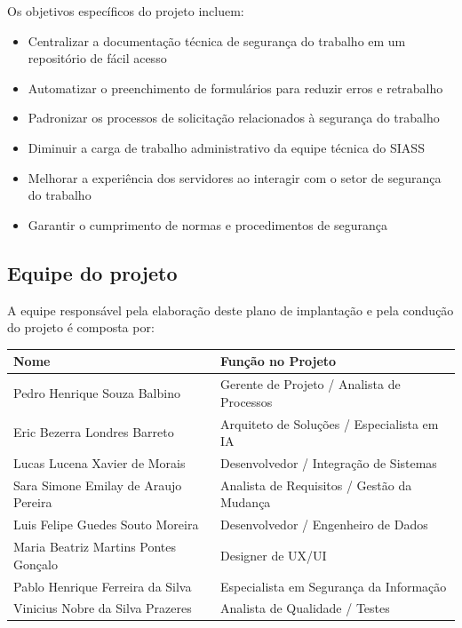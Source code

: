 \documentclass[12pt,a4paper]{article}
\begin{document}
Os objetivos específicos do projeto incluem:

\begin{itemize}
    \item Centralizar a documentação técnica de segurança do trabalho em um repositório de fácil acesso
    \item Automatizar o preenchimento de formulários para reduzir erros e retrabalho
    \item Padronizar os processos de solicitação relacionados à segurança do trabalho
    \item Diminuir a carga de trabalho administrativo da equipe técnica do SIASS
    \item Melhorar a experiência dos servidores ao interagir com o setor de segurança do trabalho
    \item Garantir o cumprimento de normas e procedimentos de segurança
\end{itemize}

\subsection{Equipe do projeto}
A equipe responsável pela elaboração deste plano de implantação e pela condução do projeto é composta por:

\begin{table}[htbp]
\centering
\begin{tabular}{|p{5cm}|p{8cm}|}
\hline
\textbf{Nome} & \textbf{Função no Projeto} \\
\hline
Pedro Henrique Souza Balbino & Gerente de Projeto / Analista de Processos \\
\hline
Eric Bezerra Londres Barreto & Arquiteto de Soluções / Especialista em IA \\
\hline
Lucas Lucena Xavier de Morais & Desenvolvedor / Integração de Sistemas \\
\hline
Sara Simone Emilay de Araujo Pereira & Analista de Requisitos / Gestão da Mudança \\
\hline
Luis Felipe Guedes Souto Moreira & Desenvolvedor / Engenheiro de Dados \\
\hline
Maria Beatriz Martins Pontes Gonçalo & Designer de UX/UI \\
\hline
Pablo Henrique Ferreira da Silva & Especialista em Segurança da Informação \\
\hline
Vinicius Nobre da Silva Prazeres & Analista de Qualidade / Testes \\
\hline
\end{tabular}
\end{table}
\end{document}
